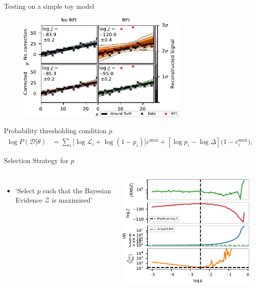 \documentclass{beamer}
\begin{document}
\begin{frame}{Testing on a simple toy model}
\begin{figure}
\includegraphics[width=0.75\textwidth]{4pane_toy_sidebar.pdf}
\end{figure}
\end{frame}

\begin{frame}{Probability thresholding condition $p$}
    \begin{equation}
    \begin{aligned}
    \log{P(\mathcal{D}|\theta)} &= \sum_{i}[{\log{\mathcal{L}_i}+\log({1-p_i})]\varepsilon^{\mathrm{max}} + [\log{p}_i - \log{\Delta}](1 - \varepsilon^\mathrm{max}_i})\label{eq:loglikelihood},
    \end{aligned}
    \end{equation}
\centering {}
\end{frame}

\begin{frame}{Selection Strategy for $p$}
\begin{columns}
    \begin{itemize} 
    \item `Select $p$ such that the Bayesian Evidence $\mathcal{Z}$ is maximised'
    \end{itemize}
\includegraphics[width=1\textwidth]{4panevert.pdf}
\end{columns}
\end{frame}
\end{document}
